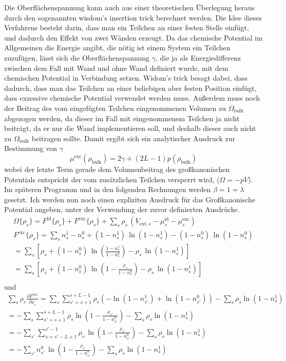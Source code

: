 \documentclass[12pt]{article}
\begin{document}
Die Oberflächenspannung kann auch aus einer theoretischen Überlegung heraus durch den sogenannten wisdom's insertion trick berechnet werden. Die Idee dieses Verfahrens besteht darin, dass man ein Teilchen an einer festen Stelle einfügt, und dadurch den Effekt von zwei Wänden erzeugt. Da das chemische Potential im Allgemeinen die Energie angibt, die nötig ist einem System ein Teilchen zuzufügen, lässt sich die Oberflächenspannung $\gamma$, die ja als Energiedifferenz zwischen dem Fall mit Wand und ohne Wand definiert wurde, mit dem chemischen Potential in Verbindung setzen. Widom's trick besagt dabei, dass dadurch, dass man das Teilchen an einer beliebigen aber festen Position einfügt, dass exzessive chemische Potential verwendet werden muss. Außerdem muss noch der Beitrag des vom eingefügten Teilchen eingenommenen Volumen zu $\Omega_\text{bulk}$ abgezogen werden, da dieser im Fall mit eingenommenem Teilchen ja nicht beiträgt, da er nur die Wand implementieren soll, und deshalb dieser auch nicht zu $\Omega_\text{bulk}$ beitragen sollte. Damit ergibt sich ein analytischer Ausdruck zur Bestimmung von $\gamma$
$$\mu^\text{exc}(\rho_\text{bulk})=2\gamma+(2L-1)p(\rho_\text{bulk})$$
wobei der letzte Term gerade dem Volumenbeitrag des großkanonischen Potentials entspricht der vom zusätzlichen Teilchen versperrt wird, ($\Omega=-pV$).
Im späteren Programm und in den folgenden Rechnungen werden $\beta=1=\lambda$ gesetzt.
Ich werden nun noch einen expliziten Ausdruck für das Großkanonische Potential angeben, unter der Verwendung der zuvor definierten Ausdrücke.
\begin{gather*}\Omega\{\rho_s\}=F^\text{id}\{\rho_s\}+F^\text{exc}\{\rho_s\}+\sum_s\rho_s\,(V_{\text{ext},s}-\mu^\text{id}_s-\mu^\text{exc}_s)\\
F^\text{exc}\{\rho_s\}=\sum_sn_s^1-n_s^0+(1-n^1_s)\,\ln(1-n^1_s)-(1-n^0_s)\,\ln(1-n^0_s)\\
=\sum_s\left[\rho_s+(1-n^0_s)\,\ln(\frac{1-n^1_s}{1-n^0_s})-\rho_s\,\ln(1-n^1_s)\right]\\
=\sum_s\left[\rho_s+(1-n^0_s)\,\ln(1-\frac{\rho_s}{1-n^0_s})-\rho_s\,\ln(1-n^1_s)\right]\\
\end{gather*}
und
\begin{gather*}
\sum_s\rho_s\frac{\partial{F}^\text{exc}}{\partial\rho_s}=\sum_s\sum_{s'=s+1}^{s+L-1}\rho_s(-\ln(1-n^1_{s'})+\ln(1-n^0_{s'}))-\sum_s\rho_s\ln(1-n^1_s)\\
=-\sum_s\sum_{s'=s+1}^{s+L-1}\rho_s\ln(1-\frac{\rho_{s'}}{1-n^0_{s'}})-\sum_s\rho_s\ln(1-n^1_s)\\
=-\sum_{s'}\sum_{s=s'-L+1}^{s'-1}\rho_s\,\ln(1-\frac{\rho_{s'}}{1-n^0_{s'}})-\sum_s\rho_s\ln(1-n^1_s)\\
=-\sum_{s'}n^0_{s'}\,\ln(1-\frac{\rho_{s'}}{1-n^0_{s'}})-\sum_s\rho_s\ln(1-n^1_s)\end{gather*}
\end{document}

